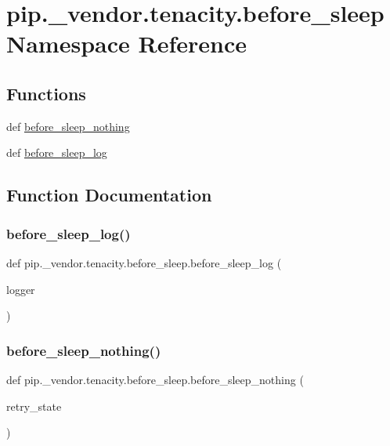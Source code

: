 \hypertarget{namespacepip_1_1__vendor_1_1tenacity_1_1before__sleep}{}\section{pip.\+\_\+vendor.\+tenacity.\+before\+\_\+sleep Namespace Reference}
\label{namespacepip_1_1__vendor_1_1tenacity_1_1before__sleep}
\subsection*{Functions}
\begin{DoxyCompactItemize}
\item 
def \hyperlink{namespacepip_1_1__vendor_1_1tenacity_1_1before__sleep_a80c886ef8d410ec8f9ffe55e0842c8b1}{before\+\_\+sleep\+\_\+nothing}
\item 
def \hyperlink{namespacepip_1_1__vendor_1_1tenacity_1_1before__sleep_a9715a10dd6b64dd8a5614ab251ebf5e6}{before\+\_\+sleep\+\_\+log}
\end{DoxyCompactItemize}


\subsection{Function Documentation}
\mbox{\label{namespacepip_1_1__vendor_1_1tenacity_1_1before__sleep_a9715a10dd6b64dd8a5614ab251ebf5e6}} 
\subsubsection{\texorpdfstring{before\+\_\+sleep\+\_\+log()}{before\_sleep\_log()}}
{\footnotesize\ttfamily def pip.\+\_\+vendor.\+tenacity.\+before\+\_\+sleep.\+before\+\_\+sleep\+\_\+log (\begin{DoxyParamCaption}\item[{}]{logger }\end{DoxyParamCaption})}

\mbox{\label{namespacepip_1_1__vendor_1_1tenacity_1_1before__sleep_a80c886ef8d410ec8f9ffe55e0842c8b1}} 
\subsubsection{\texorpdfstring{before\+\_\+sleep\+\_\+nothing()}{before\_sleep\_nothing()}}
{\footnotesize\ttfamily def pip.\+\_\+vendor.\+tenacity.\+before\+\_\+sleep.\+before\+\_\+sleep\+\_\+nothing (\begin{DoxyParamCaption}\item[{}]{retry\+\_\+state }\end{DoxyParamCaption})}

